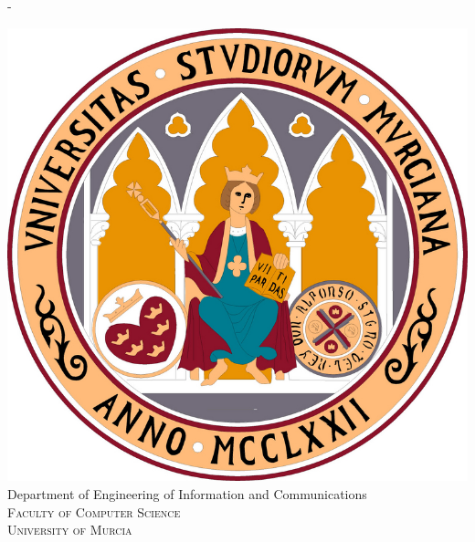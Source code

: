 %
%
% 
%
%
\begin{titlingpage}
\calccentering{\unitlength} 
\begin{adjustwidth*}{\unitlength}{-\unitlength}
\begin{center}
\vspace{-10mm}
\includegraphics[scale=0.8]{logos/UMU}\\
\vspace{6mm}
{\large Department of Engineering of Information and Communications\\
\vspace{1.5mm}
\textsc{Faculty of Computer Science}\\
\vspace{1.5mm}
\textsc{University of Murcia}}\\
\vspace{11mm}


\end{center}
\end{adjustwidth*}
\end{titlingpage}
